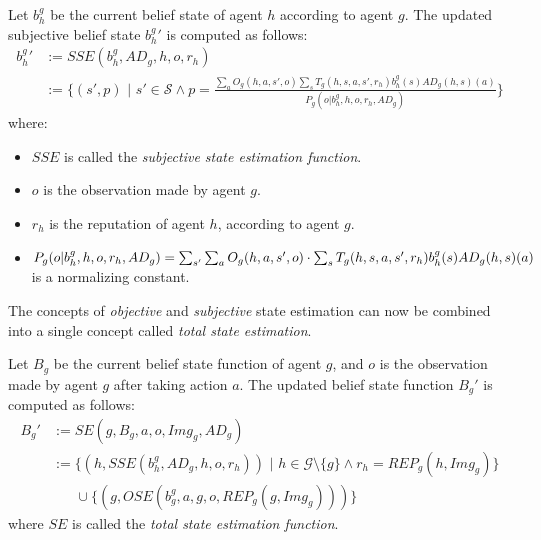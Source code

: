\begin{definition}
\label{def:sse}
Let $b_h^g$ be the current belief state of agent $h$ according to agent $g$. The updated subjective belief state ${b_h^g}'$ is computed as follows:
\begin{align*}
    {b_h^g}' &:= SSE(b_h^g, AD_g,h, o, r_h) \\&:= \Bigg\{(s', p) \,\,\Bigg| \,\, s'\in \mathcal{S} \land p =  \frac{\sum_{a}O_g(h,a,s',o) \sum_{s} T_g(h,s,a,s',r_h) b_h^g(s) AD_g(h,s)(a)}{P_g(o | b_h^g,h,o,r_h,AD_g)} \Bigg\}
\end{align*}
where:
\begin{itemize}
    \item $SSE$ is called the \textit{subjective state estimation function}.
    \item $o$ is the observation made by agent $g$.
    \item $r_h$ is the reputation of agent $h$, according to agent $g$.
    \item $P_g(o | b_h^g,h,o,r_h,AD_g) = \sum_{s'}\sum_{a }O_g(h,a,s',o) \\\cdot\sum_{s} T_g(h,s,a,s',r_h) b_h^g(s) AD_g(h,s)(a)$ is a normalizing constant.
\end{itemize}
\end{definition}

The concepts of \textit{objective} and \textit{subjective} state estimation can now be combined into a single concept called \textit{total state estimation}.

\begin{definition}
Let $B_g$ be the current belief state function of agent $g$, and $o$ is the observation made by agent $g$ after taking action $a$. The updated belief state function $B_g'$ is computed as follows:
\begin{align*}
    B_g' &:= SE(g,B_g,a,o, Img_g, AD_g) \\&:=  \Big\{(h, SSE(b_h^g, AD_g, h, o, r_h)) \,\,\Big| \,\, h\in \mathcal{G} \setminus \{ g \} \land r_h = REP_g(h, Img_g) \Big\} \\
    & \,\,\,\,\,\,\,\,\,\,\cup \Big\{(g, OSE(b_g^g, a, g, o, REP_g(g, Img_g)))  \Big\}
\end{align*}
where $SE$ is called the \textit{total state estimation function}.
\end{definition}

